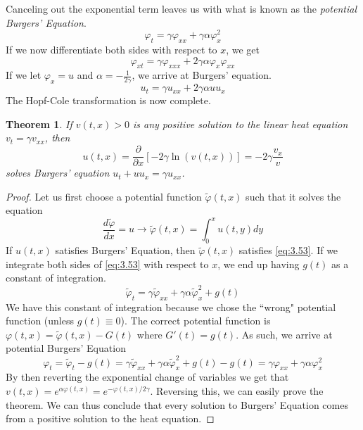 \documentclass{article}
\newcommand{\pd}[2]{\frac{\partial #1}{\partial #2}}
\newcommand{\od}[2]{\frac{d #1}{d #2}}
\newtheorem{theorem}{Theorem}[section]
\numberwithin{equation}{section}
\begin{document}
Canceling out the exponential term leaves us with what is known as the \textit{potential Burgers' Equation}. 
\begin{equation}
    \varphi_t= \gamma\varphi_{xx}+\gamma\alpha \varphi_x^2 \label{eq:pbe}
\end{equation}
If we now differentiate both sides with respect to $x$, we get
\begin{equation}
    \varphi_{xt} = \gamma \varphi_{xxx}+2\gamma \alpha \varphi_{x} \varphi_{xx} \label{eq:3.53}
\end{equation}
If we let $\varphi_x=u$ and $\alpha =-\frac{1}{2\gamma}$, we arrive at Burgers' equation.
\begin{equation*}
    u_t = \gamma u_{xx} + 2\gamma \alpha uu_{x}
\end{equation*}
The Hopf-Cole transformation is now complete.
\begin{theorem}
    If $v(t,x) >0$ is any positive solution to the linear heat equation $v_t=\gamma v_{xx}$, then 
    \begin{equation}
        u(t,x) =\pd{}{x} [-2\gamma \ln(v(t,x))] =  -2\gamma \frac{v_x}{v}
    \end{equation}
    solves Burgers' equation $u_t +uu_x = \gamma u_{xx}$.
\end{theorem}
\begin{proof}
    Let us first choose a potential function $\tilde{\varphi} (t,x) $ such that it solves the equation 
    \begin{equation*}
        \od{\tilde{\varphi}}{x} = u \rightarrow \tilde{\varphi}(t,x) = \int^x_0 u(t,y)dy
    \end{equation*}
    If $u(t,x)$ satisfies Burgers' Equation, then $\tilde{\varphi}(t,x)$ satisfies \eqref{eq:3.53}. If we integrate both sides of \eqref{eq:3.53} with respect to $x$, we end up having $g(t)$ as a constant of integration.
    \begin{equation*}
        \tilde{\varphi}_t = \gamma \tilde{\varphi}_{xx} +\gamma \alpha \tilde{\varphi}_x^2 + g(t)
    \end{equation*}
    We have this constant of integration because we chose the ``wrong" potential function (unless $g(t) \equiv 0$). The correct potential function is $\varphi(t,x) = \tilde{\varphi}(t,x) -G(t)$ where $G'(t) = g(t)$. As such, we arrive at potential Burgers' Equation
    \begin{equation*}
        \varphi_t = \tilde{\varphi}_t - g(t) = \gamma \tilde{\varphi}_{xx} +\gamma \alpha \tilde{\varphi}_x^2 + g(t) - g(t) =\gamma \varphi_{xx} +\gamma \alpha \varphi_x^2
    \end{equation*}
    By then reverting the exponential change of variables we get that $v(t,x) = e^{\alpha \varphi(t,x)}=e^{-\varphi (t,x)/2\gamma}$. Reversing this, we can easily prove the theorem. We can thus conclude that every solution to Burgers' Equation comes from a positive solution to the heat equation.
\end{proof}
\end{document}
